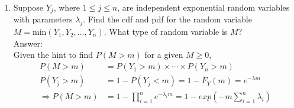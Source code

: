 \documentclass{article}
\begin{document}
\begin{enumerate}
\begin{enumerate}
                Then, given that $ \frac{X - \mu}{\sigma} = Z \sim \text{normal}(0,1) $,\\ it follows that
                $$ \frac{343.62-186.75}{11.8348} = Z \approx 13.25$$
                Since the $Z$ value obtained is roughly 4 times larger than the largest $Z$ value on the table provided,
                and since the cdf approaches 1 as $Z\rightarrow\infty$,
                it can be concluded that
                $$ P(X \geq 343.62) = 1 - P(X < 343.62) \approx 1 - 1 = \fbox{0} $$
            \item   What conclusion might you draw from your calculation in (b)? How many deaths in the 3-month period 
                    would you accept as consistent with your expectations?
                    \\Answer:\\
                    Conclusions may include:
                    \begin{enumerate}
                        \item   data collection or calculation error.
                        \item   clustering of birthdays with some mass death event in the sampled decedent data.
                        \item   underlying causal factor(s) in the mortality rate in the 3-month period following a birthday.
                    \end{enumerate}
                    In the expected even distribution case, it would be expected to have roughly 187 $\pm$ 12 deaths occur.
        \end{enumerate}
    \clearpage
    \item   Suppose $Y_j$, where $1 \leq j \leq n$, are independent exponential random variables with parameters 
            $\lambda_j$. Find the cdf and pdf for the random variable $M = \text{min}(Y_1,Y_2,\ldots,Y_n)$. 
            What type of random variable is $M$?
            \\Answer:\\
            Given the hint to find $P(M>m)$ for a given $M\geq0$,
            \begin{align*}
                P(M>m) &= P(Y_1 > m) \times \cdots \times P(Y_n > m) \\
                P(Y_j > m) &= 1 - P(Y_j < m) = 1 - F_Y(m) = e^{-\lambda m} \\
                \Rightarrow P(M>m) &= 1 - \prod_{i=1}^{n} e^{-\lambda_{i} m} =1 - exp\left(-m\sum_{i=1}^{n}\lambda_{i}\right)

\end{align*}
\end{enumerate}
\end{document}
